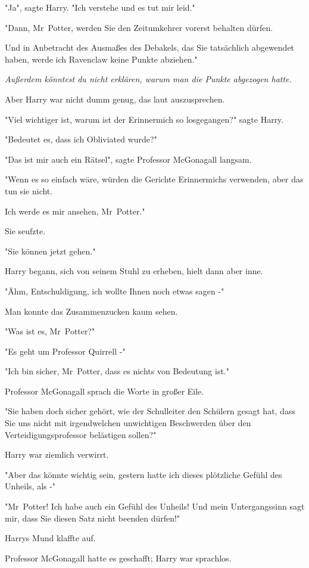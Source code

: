 {"Ja", sagte Harry. "Ich verstehe und es tut mir leid."

"Dann, Mr~Potter, werden Sie den Zeitumkehrer vorerst behalten dürfen.

Und in Anbetracht des Ausmaßes des Debakels, das Sie tatsächlich abgewendet haben, werde ich Ravenclaw keine Punkte abziehen."

\emph{Außerdem könntest du nicht erklären, warum man die Punkte abgezogen hatte.}

Aber Harry war nicht dumm genug, das laut auszusprechen.

"Viel wichtiger ist, warum ist der Erinnermich so losgegangen?" sagte Harry.

"Bedeutet es, dass ich Obliviated wurde?"

"Das ist mir auch ein Rätsel", sagte Professor McGonagall langsam.

"Wenn es so einfach wäre, würden die Gerichte Erinnermichs verwenden, aber das tun sie nicht.

Ich werde es mir ansehen, Mr~Potter."

Sie seufzte.

"Sie können jetzt gehen."

Harry begann, sich von seinem Stuhl zu erheben, hielt dann aber inne.

"Ähm, Entschuldigung, ich wollte Ihnen noch etwas sagen -"

Man konnte das Zusammenzucken kaum sehen.

"Was ist es, Mr~Potter?"

"Es geht um Professor Quirrell -"

"Ich bin sicher, Mr~Potter, dass es nichts von Bedeutung ist."

Professor McGonagall sprach die Worte in großer Eile.

"Sie haben doch sicher gehört, wie der Schulleiter den Schülern gesagt hat, dass Sie uns nicht mit irgendwelchen unwichtigen Beschwerden über den Verteidigungsprofessor belästigen sollen?"

Harry war ziemlich verwirrt.

"Aber das könnte wichtig sein, gestern hatte ich dieses plötzliche Gefühl des Unheils, als -"

"Mr~Potter! Ich habe auch ein Gefühl des Unheils! Und mein Untergangssinn sagt mir, dass Sie diesen Satz nicht beenden dürfen!"

Harrys Mund klaffte auf.

Professor McGonagall hatte es geschafft; Harry war sprachlos.

}
